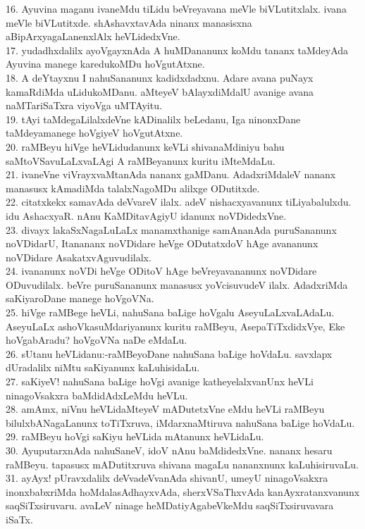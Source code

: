 \documentclass{article}
\begin{document}
16. Ayuvina maganu ivaneMdu tiLidu beVreyavana meVle biVLutitxlalx. ivana meVle biVLutitxde. shAshavxtavAda ninanx manasisxna aBipArxyagaLanenxlAlx heVLidedxVne.\\
17. yudadhxdalilx ayoVgayxnAda A huMDananunx koMdu tananx taMdeyAda Ayuvina manege karedukoMDu hoVgutAtxne.\\
18. A deYtayxnu I nahuSananunx kadidxdadxnu. Adare avana puNayx kamaRdiMda uLidukoMDanu. aMteyeV bAlayxdiMdalU avanige avana naMTariSaTxra viyoVga uMTAyitu.\\
19. tAyi taMdegaLilalxdeVne kADinalilx beLedanu, Iga ninonxDane taMdeyamanege hoVgiyeV hoVgutAtxne.\\
20. raMBeyu hiVge heVLidudanunx keVLi shivanaMdiniyu bahu saMtoVSavuLaLxvaLAgi A raMBeyanunx kuritu iMteMdaLu.\\
21. ivaneVne viVrayxvaMtanAda nananx gaMDanu. AdadxriMdaleV nananx manasusx kAmadiMda talalxNagoMDu alilxge ODutitxde.\\
22. citatxkekx samavAda deVvareV ilalx. adeV nishacxyavanunx tiLiyabalulxdu. idu AshacxyaR. nAnu KaMDitavAgiyU idanunx noVDidedxVne.\\
23. divayx lakaSxNagaLuLaLx manamxthanige samAnanAda puruSananunx noVDidarU, Itanananx noVDidare heVge ODutatxdoV hAge avananunx noVDidare AsakatxvAguvudilalx.\\
24. ivananunx noVDi heVge ODitoV hAge beVreyavananunx noVDidare ODuvudilalx. beVre puruSananunx manasusx yoVcisuvudeV ilalx. AdadxriMda saKiyaroDane manege hoVgoVNa.\\
25. hiVge raMBege heVLi, nahuSana baLige hoVgalu AseyuLaLxvaLAdaLu. AseyuLaLx ashoVkasuMdariyanunx kuritu raMBeyu, AsepaTiTxdidxVye, Eke hoVgabAradu? hoVgoVNa naDe eMdaLu.\\
26. sUtanu heVLidanu:-raMBeyoDane nahuSana baLige hoVdaLu. savxlapx dUradalilx niMtu saKiyanunx kaLuhisidaLu.\\
27. saKiyeV! nahuSana baLige hoVgi avanige katheyelalxvanUnx heVLi ninagoVsakxra baMdidAdxLeMdu heVLu.\\
28. amAmx, niVnu heVLidaMteyeV mADutetxVne eMdu heVLi raMBeyu bilulxbANagaLanunx toTiTxruva, iMdarxnaMtiruva nahuSana baLige hoVdaLu.\\
29. raMBeyu hoVgi saKiyu heVLida mAtanunx heVLidaLu.\\
30. AyuputarxnAda nahuSaneV, idoV nAnu baMdidedxVne. nananx hesaru raMBeyu. tapasusx mADutitxruva shivana magaLu nananxnunx kaLuhisiruvaLu.\\
31. ayAyx! pUravxdalilx deVvadeVvanAda shivanU, umeyU ninagoVsakxra inonxbabxriMda hoMdalasAdhayxvAda, sherxVSaThxvAda kanAyxratanxvanunx saqSiTxsiruvaru. avaLeV ninage heMDatiyAgabeVkeMdu saqSiTxsiruvavara iSaTx.\\
\end{document}
